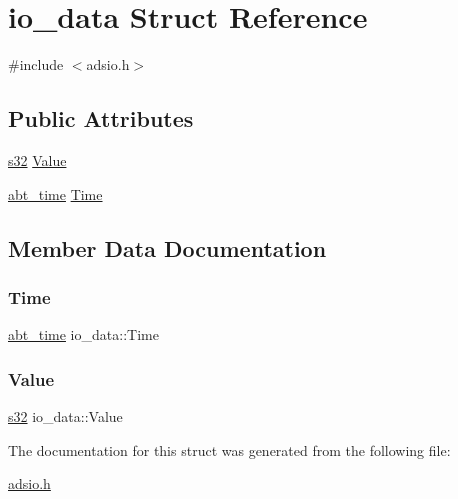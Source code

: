 \hypertarget{structio__data}{}\section{io\+\_\+data Struct Reference}
\label{structio__data}


{\ttfamily \#include $<$adsio.\+h$>$}

\subsection*{Public Attributes}
\begin{DoxyCompactItemize}
\item 
\hyperlink{ab__common_8h_ae9b1af5c037e57a98884758875d3a7c4}{s32} \hyperlink{structio__data_a9171c6d890faeea3eba2aa87600d0975}{Value}
\item 
\hyperlink{ab__time_8h_adc59735fd0d20e93fe3016c8b6a4f782}{abt\+\_\+time} \hyperlink{structio__data_a9f49c3a9e68a9959ed47b179d8a47a84}{Time}
\end{DoxyCompactItemize}


\subsection{Member Data Documentation}
\mbox{\label{structio__data_a9f49c3a9e68a9959ed47b179d8a47a84}} 
\subsubsection{\texorpdfstring{Time}{Time}}
{\footnotesize\ttfamily \hyperlink{ab__time_8h_adc59735fd0d20e93fe3016c8b6a4f782}{abt\+\_\+time} io\+\_\+data\+::\+Time}

\mbox{\label{structio__data_a9171c6d890faeea3eba2aa87600d0975}} 
\subsubsection{\texorpdfstring{Value}{Value}}
{\footnotesize\ttfamily \hyperlink{ab__common_8h_ae9b1af5c037e57a98884758875d3a7c4}{s32} io\+\_\+data\+::\+Value}



The documentation for this struct was generated from the following file\+:\begin{DoxyCompactItemize}
\item 
\hyperlink{adsio_8h}{adsio.\+h}\end{DoxyCompactItemize}
